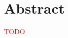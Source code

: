 \documentclass[thesis.tex]{subfiles}
\begin{document}
\chapter*{Abstract}
\textcolor{red}{TODO}
\end{document}
